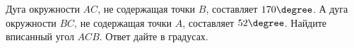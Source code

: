 \begin{ex}
	\begin{condition}
		Дуга окружности \( AC \), не содержащая точки \( B \), составляет \( 170\degree \). А дуга окружности \( BC \), не содержащая точки \( A \), составляет \( 52 \degree\). Найдите вписанный угол \( ACB \). Ответ дайте в градусах.
	\end{condition}
\end{ex}